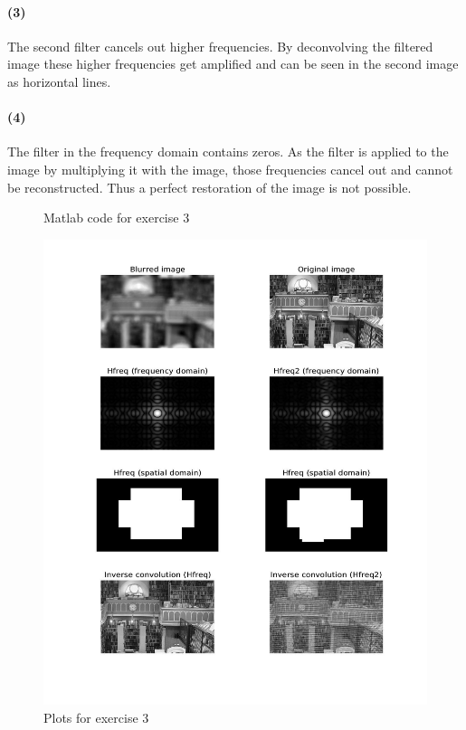 \documentclass[a4paper]{article}
\begin{document}
\paragraph{(3)}
The second filter cancels out higher frequencies. By deconvolving the filtered image these higher frequencies get amplified and can be seen in the second image as horizontal lines.

\paragraph{(4)}
The filter in the frequency domain contains zeros. As the filter is applied to the image by multiplying it with the image, those frequencies cancel out and cannot be reconstructed. Thus a perfect restoration of the image is not possible.


\begin{figure}[htp]
    \centering
    
    \caption{Matlab code for exercise 3}
    \label{ex03}
\end{figure}

\begin{figure}[htp]
    \centering
    \includegraphics[width=\textwidth]{plot03.jpg}
    \caption{Plots for exercise 3}
    \label{plot03}
\end{figure}
\end{document}
